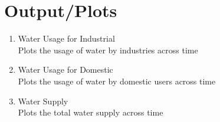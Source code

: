 \documentclass{article}
\begin{document}
\section*{Output/Plots}
\begin{enumerate}
    \item Water Usage for Industrial\\
Plots the usage of water by industries across time
    \item Water Usage for Domestic  \\
Plots the usage of water by domestic users across time
    \item Water Supply  \\
    Plots the total water supply across time
\end{enumerate}
\end{document}
